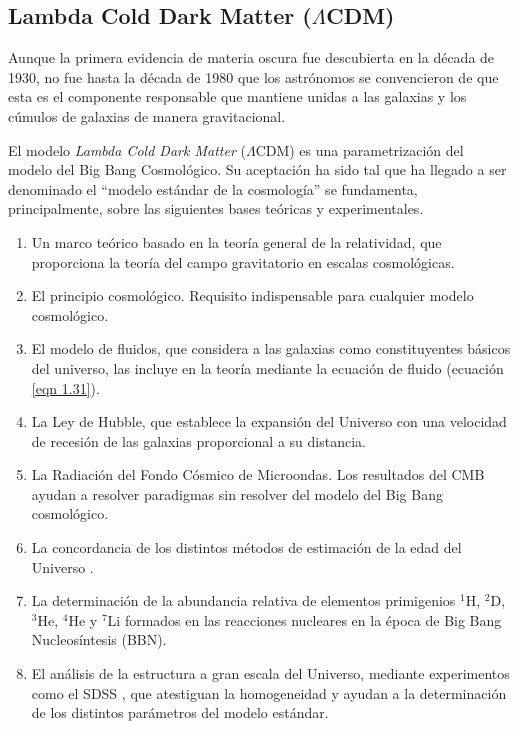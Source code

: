 \documentclass[a4paper,openright,12pt]{book}
\begin{document}



\subsection{Lambda Cold Dark Matter ($\Lambda$CDM)}
Aunque la primera evidencia de materia oscura fue descubierta en la década de 1930, no fue hasta la década de 1980 que los astrónomos se convencieron de que esta es el componente responsable que mantiene unidas a las galaxias y los cúmulos de galaxias de manera gravitacional.

El modelo \textit{Lambda Cold Dark Matter} ($\Lambda$CDM) es una parametrización del modelo del Big Bang Cosmológico. Su aceptación ha sido tal que ha llegado a ser denominado  el ``modelo estándar de la cosmología'' se  fundamenta,  principalmente, sobre las siguientes bases teóricas y experimentales. 
\begin{enumerate}
\item Un marco teórico basado en la teoría general de la relatividad, que proporciona la teoría del campo gravitatorio en escalas cosmológicas.
\item El principio cosmológico. Requisito indispensable para cualquier modelo cosmológico.
\item El modelo de fluidos, que considera a las galaxias como constituyentes básicos del universo, las incluye en la teoría mediante la ecuación de fluido (ecuación \ref{eqn 1.31}).
\item La Ley de Hubble, que establece la expansión del Universo con una velocidad de recesión de las galaxias proporcional a su distancia.
\item La Radiación del Fondo Cósmico de Microondas. Los resultados del CMB ayudan a resolver paradigmas sin resolver del modelo del Big Bang cosmológico.
\item La concordancia de los distintos métodos de estimación de la edad del Universo \cite{1.1.5}. 
\item La determinación de la abundancia relativa de elementos primigenios $^{1}$H, $^{2}$D, $^{3}$He, $^{4}$He y $^{7}$Li formados en las reacciones nucleares en la época de Big Bang Nucleosíntesis (BBN)\cite{1.1.6, 1.1.7, 1.1.8}.
\item El análisis de la estructura a gran escala del Universo, mediante experimentos como el SDSS \cite{1.1.9} , que atestiguan la homogeneidad y ayudan a la determinación de los distintos parámetros del modelo estándar.

\end{enumerate}
\end{document}
